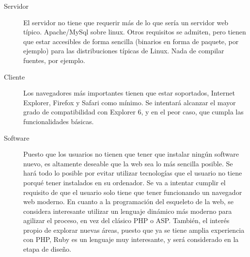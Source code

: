 \begin{description}
	\item[Servidor] El servidor no tiene que requerir más de lo que sería un servidor web típico. Apache/MySql sobre linux. Otros requisitos se admiten, pero tienen que estar accesibles de forma sencilla (binarios en forma de paquete, por ejemplo) para las distribuciones típicas de Linux. Nada de compilar fuentes, por ejemplo.
	\item[Cliente] Los navegadores más importantes tienen que estar soportados, Internet Explorer, Firefox y Safari como mínimo. Se intentará alcanzar el mayor grado de compatibilidad con Explorer 6, y en el peor caso, que cumpla las funcionalidades básicas.
	\item[Software] Puesto que los usuarios no tienen que tener que instalar ningún software nuevo, es altamente deseable que la web sea lo más sencilla posible. Se hará todo lo posible por evitar utilizar tecnologías que el usuario no tiene porqué tener instalados en su ordenador. Se va a intentar cumplir el requisito de que el usuario solo tiene que tener funcionando un navegador web moderno. En cuanto a la programación del esqueleto de la web, se considera interesante utilizar un lenguaje dinámico más moderno para agilizar el proceso, en vez del clásico PHP o ASP. También, el interés propio de explorar nuevas áreas, puesto que ya se tiene amplia experiencia con PHP, Ruby es un lenguaje muy interesante, y será considerado en la etapa de diseño.
\end{description}
